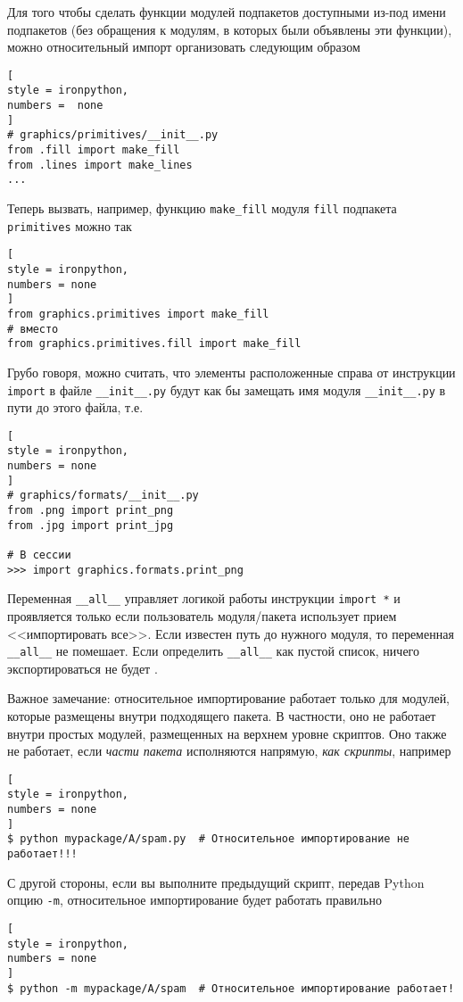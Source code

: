 \documentclass[%
	11pt,
	a4paper,
	utf8,
		]{article}
\begin{document}
Для того чтобы сделать функции модулей подпакетов доступными из-под имени подпакетов (без обращения к модулям, в которых были объявлены эти функции), можно относительный импорт организовать следующим образом
\begin{lstlisting}[
style = ironpython,
numbers =  none
]
# graphics/primitives/__init__.py
from .fill import make_fill
from .lines import make_lines
...
\end{lstlisting}

Теперь вызвать, например, функцию \texttt{make\_fill} модуля \texttt{fill} подпакета \texttt{primitives} можно так
\begin{lstlisting}[
style = ironpython,
numbers = none
]
from graphics.primitives import make_fill
# вместо
from graphics.primitives.fill import make_fill
\end{lstlisting}

Грубо говоря, можно считать, что элементы расположенные справа от инструкции \texttt{import} в файле \verb|__init__.py| будут как бы замещать имя модуля \verb|__init__.py| в пути до этого файла, т.е.
\begin{lstlisting}[
style = ironpython,
numbers = none
]
# graphics/formats/__init__.py
from .png import print_png
from .jpg import print_jpg

# В сессии
>>> import graphics.formats.print_png
\end{lstlisting}

Переменная \verb|__all__| управляет логикой работы инструкции \verb|import *| и проявляется только если пользователь модуля/пакета использует прием <<импортировать все>>. Если известен путь до нужного модуля, то переменная \verb|__all__| не помешает. Если определить \verb|__all__| как пустой список, ничего экспортироваться не будет \cite[]{beazley:python_cookbook-2019}.

Важное замечание: относительное импортирование работает только для модулей, которые размещены внутри подходящего пакета. В частности, оно не работает внутри простых модулей, размещенных на верхнем уровне скриптов. Оно также не работает, если \emph{части пакета} исполняются напрямую, \emph{как скрипты}, например \cite[]{beazley:python_cookbook-2019}
\begin{lstlisting}[
style = ironpython,
numbers = none
]
$ python mypackage/A/spam.py  # Относительное импортирование не работает!!!
\end{lstlisting}

С другой стороны, если вы выполните предыдущий скрипт, передав Python опцию \verb|-m|, относительное импортирование будет работать правильно
\begin{lstlisting}[
style = ironpython,
numbers = none
]
$ python -m mypackage/A/spam  # Относительное импортирование работает!
\end{lstlisting}
\end{document}
